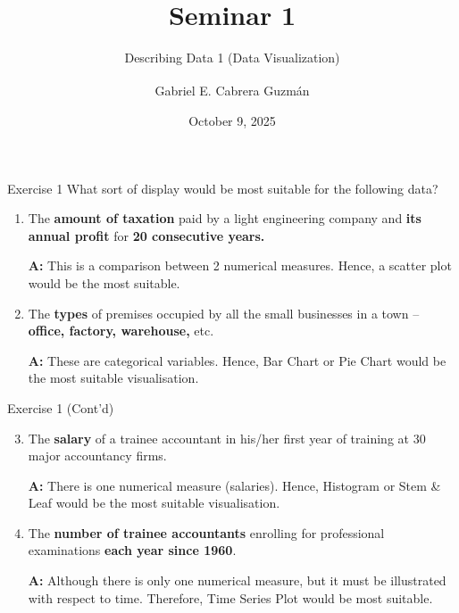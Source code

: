 \documentclass[
  ignorenonframetext,
  aspectratio=43,
]{beamer}
\title[Seminar 1]{Seminar
1\daggerfootnote{\texttt{gabriel.cabreraguzman@postgrad.manchester.ac.uk}}}
\subtitle{Describing Data 1 (Data Visualization)}
\author[Gabriel E. Cabrera Guzmán]{
    {Gabriel E. Cabrera
Guzmán\textsuperscript{\normalsize\orcidlink{0000-0000-0000-0000}}} \medskip
}
\date{October 9, 2025}
\institute[]{
    The University of Manchester\\
Alliance Manchester Business School \bigskip
}
\let\olditem\item
\renewcommand\item{\olditem\justifying}
\begin{document}
\frame{\titlepage}
\ifdefined\Shaded\renewenvironment{Shaded}{\begin{tcolorbox}[boxrule=0pt, frame hidden, borderline west={3pt}{0pt}{shadecolor}, interior hidden, enhanced, sharp corners, breakable]}{\end{tcolorbox}}\fi

\begin{frame}{Exercise 1}
\protect\hypertarget{exercise-1}{}
What sort of display would be most suitable for the following data?

\begin{enumerate}
\item
  The \textbf{amount of taxation} paid by a light engineering company
  and \textbf{its annual profit} for \textbf{20 consecutive years.}

  \pause

  \textbf{A:} This is a comparison between 2 numerical measures. Hence,
  a scatter plot would be the most suitable.

  \pause
\item
  The \textbf{types} of premises occupied by all the small businesses in
  a town -- \textbf{office, factory, warehouse,} etc.

  \pause

  \textbf{A:} These are categorical variables. Hence, Bar Chart or Pie
  Chart would be the most suitable visualisation.
\end{enumerate}
\end{frame}

\begin{frame}{Exercise 1 (Cont'd)}
\protect\hypertarget{exercise-1-contd}{}
\begin{enumerate}
\setcounter{enumi}{2}
\item
  The \textbf{salary} of a trainee accountant in his/her first year of
  training at 30 major accountancy firms.

  \pause

  \textbf{A:} There is one numerical measure (salaries). Hence,
  Histogram or Stem \& Leaf would be the most suitable visualisation.

  \pause
\item
  The \textbf{number of trainee accountants} enrolling for professional
  examinations \textbf{each year since 1960}.

  \pause

  \textbf{A:} Although there is only one numerical measure, but it must
  be illustrated with respect to time. Therefore, Time Series Plot would
  be most suitable.
\end{enumerate}
\end{frame}
\end{document}
